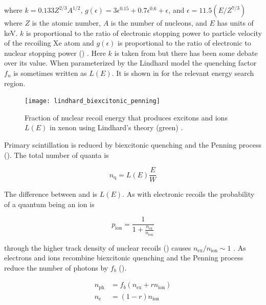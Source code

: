 \noindent where $k = 0.133Z^{2/3}A^{1/2}$, $g(\epsilon) = 3\epsilon^{0.15} + 0.7\epsilon^{0.6} + \epsilon$, and
$\epsilon = 11.5 (E / Z^{7/3})$ where $Z$ is the atomic number, $A$ is the number of nucleons, and $E$ has units of keV.  $k$ is
proportional to the ratio of
electronic stopping power to particle velocity of the recoiling Xe atom  and $g(\epsilon)$ is proportional
to the ratio of electronic to nuclear stopping power () .  Here $k$ is taken
from  but there has been some debate over its value.  When parameterized by the Lindhard model the quenching factor
$f_{n}$ is sometimes written as $L(E)$.  It is shown in  for the relevant energy search region.

\begin{figure}
\texttt{[image: lindhard\_biexcitonic\_penning]}
\caption{Fraction of nuclear recoil energy that produces excitons and ions $L(E)$ in xenon using Lindhard's theory (green)
.}
\label{fig:lindhard}
\end{figure}

Primary scintillation is reduced by biexcitonic quenching and the Penning process ().  The total
number of quanta is

\begin{equation}
n_{\mathrm{q}} = L(E) \frac{E}{W}
\label{eq:nquant_nr}
\end{equation}

\noindent The difference between  and  is $L(E)$.  As with electronic recoils the probability
of a quantum being an ion is

\begin{equation}
p_{\mathrm{ion}} = \frac{1}{1 + \frac{ n_{\mathrm{ex}} }{ n_{\mathrm{ion}} }}
\end{equation}

\noindent through the higher track density of nuclear recoils ()  causes
$n_{\mathrm{ex}} / n_{\mathrm{ion}} \sim 1$ .  As electrons and ions
recombine biexcitonic quenching and the Penning process reduce the number of photons by $f_b$ ().

\begin{subequations}
\begin{align}
n_{\mathrm{ph}} &= f_b ( n_{\mathrm{ex}} + rn_{\mathrm{ion}} ) \\
n_{\mathrm{e}} &= (1 - r)n_{\mathrm{ion}}
\end{align}
\end{subequations}



